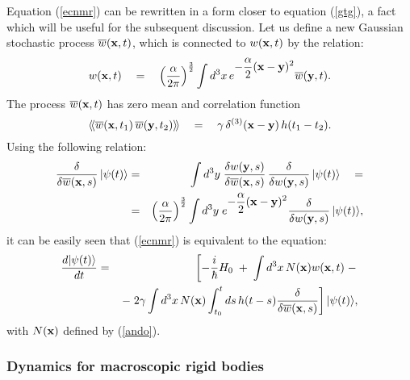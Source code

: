 \documentclass[10pt,a4paper]{article}
\newcommand{\llangle}{\langle\!\langle}
\newcommand{\rrangle}{\rangle\!\rangle}
\begin{document}
Equation (\ref{ecnmr}) can be rewritten in a form closer to
equation (\ref{gtg}), a fact which will be useful for the subsequent
discussion. Let us define a new Gaussian stochastic process
$\overline{w}({\bf x}, t)$, which is connected to $w({\bf x}, t)$
by the relation:
\begin{equation}
w({\bf x}, t) \quad = \quad
\left(\frac{\alpha}{2\pi}\right)^{\frac{3}{2}} \int d^{3}x\,
e^{\displaystyle -\frac{\alpha}{2} ({\bf x} - {\bf y})^{2}}
\overline{w}({\bf y}, t).
\end{equation}
The process $\overline{w}({\bf x}, t)$ has zero mean and
correlation function
\begin{equation}
\llangle \overline{w}({\bf x}, t_{1})\, \overline{w}({\bf y},
t_{2}) \rrangle \quad = \quad \gamma\, \delta^{(3)}({\bf x} - {\bf
y})\, h(t_{1} - t_{2}).
\end{equation}
Using the following relation:
\begin{eqnarray}
\frac{\delta}{\delta \overline{w}({\bf x}, s)}\, |\psi(t)\rangle &
= & \int d^{3}y\; \frac{\delta w({\bf y}, s)}{\delta
\overline{w}({\bf x}, s)}\, \frac{\delta}{\delta w({\bf y}, s)}\,
|\psi(t)\rangle
\quad = \nonumber \\
& = & \left(\frac{\alpha}{2\pi}\right)^{\frac{3}{2}} \int d^{3}y\;
e^{\displaystyle -\frac{\alpha}{2} ({\bf x} - {\bf y})^{2}}
\frac{\delta}{\delta w({\bf y}, s)}\, |\psi(t)\rangle,
\end{eqnarray}
it can be easily seen that (\ref{ecnmr}) is equivalent to the
 equation:
\begin{eqnarray} \label{ecnmr2}
\frac{d |\psi(t)\rangle}{dt} & = & \left[ -\frac{i}{\hbar} H_{0}
\; + \; \int d^{3}x\, N{(\bf x}) w({\bf x}, t) \; - \right.
\\ & &
\left. - \; 2\gamma \int d^{3}x\, N({\bf x}) \int_{t_{0}}^{t} ds\,
h(t - s) \frac{\delta}{\delta \overline{w}({\bf x}, s)}
\right]|\psi(t)\rangle, \nonumber
\end{eqnarray}
with $N{(\bf x})$ defined by (\ref{ando}).


\subsubsection{Dynamics for macroscopic rigid bodies} \label{nsec51}
\end{document}

